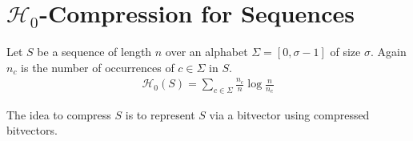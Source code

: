 \section{$\mathcal{H}_0$-Compression for Sequences}

\begin{Definition}
  Let $S$ be a sequence of length $n$ over an alphabet $\Sigma = [0, \sigma - 1]$ of size $\sigma$. Again $n_c$ is the number of occurrences of $c \in \Sigma$ in $S$.
  \begin{align}
    \mathcal{H}_0(S) = \sum\limits_{c \in \Sigma} \frac{n_c}{n}\log\frac{n}{n_c}
  \end{align}
\end{Definition}

The idea to compress $S$ is to represent $S$ via a bitvector using compressed bitvectors.
